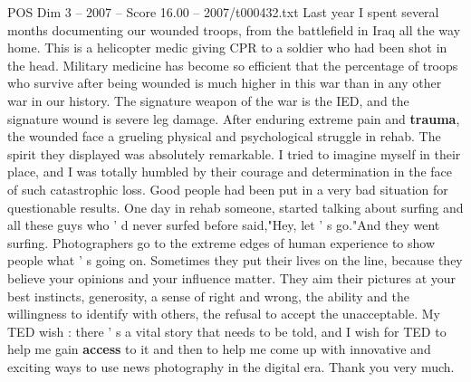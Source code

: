 \begin{textsample}{POS Dim 3 – 2007 – Score 16.00 – 2007/t000432.txt}
Last year I spent several months documenting our wounded troops, from the battlefield in Iraq all the way home.
This is a helicopter medic giving CPR to a soldier who had been shot in the head.
Military medicine has become so efficient that the percentage of troops who survive after being wounded is much higher in this war than in any other war in our history.
The signature weapon of the war is the IED, and the signature wound is severe leg damage.
After enduring extreme pain and \textbf{trauma}, the wounded face a grueling physical and psychological struggle in rehab.
The spirit they displayed was absolutely remarkable.
I tried to imagine myself in their place, and I was totally humbled by their courage and determination in the face of such catastrophic loss.
Good people had been put in a very bad situation for questionable results.
One day in rehab someone, started talking about surfing and all these guys who ' d never surfed before said,"Hey, let ' s go."And they went surfing.
Photographers go to the extreme edges of human experience to show people what ' s going on.
Sometimes they put their lives on the line, because they believe your opinions and your influence matter.
They aim their pictures at your best instincts, generosity, a sense of right and wrong, the ability and the willingness to identify with others, the refusal to accept the unacceptable.
My TED wish : there ' s a vital story that needs to be told, and I wish for TED to help me gain \textbf{access} to it and then to help me come up with innovative and exciting ways to use news photography in the digital era.
Thank you very much.

\end{textsample}

